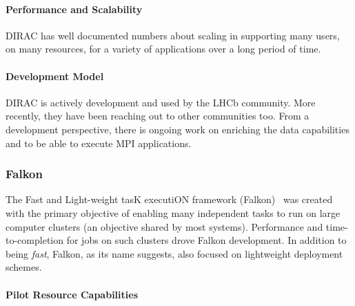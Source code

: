 \documentclass{sig-alternate}
\begin{document}
\paragraph{Performance and Scalability}

DIRAC has well documented numbers about scaling in supporting many users, on
many resources, for a variety of applications over a long period of
time.

\paragraph{Development Model}

DIRAC is actively development and used by the LHCb community\cite{}. More
recently, they have been reaching out to other communities
too\cite{}. From a development perspective, there is ongoing work on enriching
the data capabilities\cite{} and to be able to execute MPI applications\cite{}.

%
%
\subsubsection{Falkon}
\label{sec:falkon}


The Fast and Light-weight tasK executiON framework (Falkon)~\cite{1362680} was
created with the primary objective of enabling many independent tasks to run on
large computer clusters (an objective shared by most \pilot systems).
Performance and time-to-completion for jobs on such clusters drove Falkon
development. In addition to being \textit{fast}, Falkon, as its name suggests,
also focused on lightweight deployment schemes.

\paragraph{Pilot Resource Capabilities}
\end{document}

